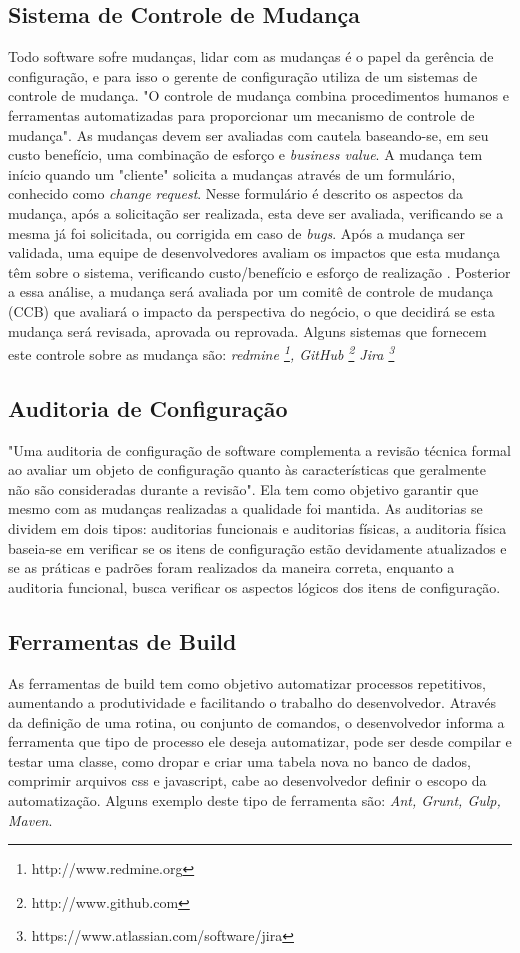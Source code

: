 \subsection{Sistema de Controle de Mudança}
Todo software sofre mudanças, lidar com as mudanças é o papel da gerência de configuração, e para isso o gerente de configuração utiliza de um sistemas de controle de mudança. "O controle de mudança combina procedimentos humanos e ferramentas automatizadas para proporcionar um mecanismo de controle de mudança"\space {}. As mudanças devem ser avaliadas com cautela baseando-se, em seu custo benefício, uma combinação de esforço e \textit{business value}. A mudança tem início quando um "cliente" solicita a mudanças através de um formulário, conhecido como \textit{change request}. Nesse formulário é descrito os aspectos da mudança, após a solicitação ser realizada, esta deve ser avaliada, verificando se a mesma já foi solicitada, ou corrigida em caso de \textit{bugs}. Após a mudança ser validada, uma equipe de desenvolvedores avaliam os impactos que esta mudança têm sobre o sistema, verificando custo/benefício e esforço de realização \cite{sommerville2011}. Posterior a essa análise, a mudança será avaliada por um comitê de controle de mudança (CCB) que avaliará o impacto da perspectiva do negócio, o que decidirá se esta mudança será revisada, aprovada ou reprovada. Alguns sistemas que fornecem este controle sobre as mudança são: \textit{redmine \footnote{http://www.redmine.org}, GitHub \footnote{http://www.github.com} Jira \footnote{https://www.atlassian.com/software/jira}}
\subsection{Auditoria de Configuração}
"Uma auditoria de configuração de software complementa a revisão técnica formal ao avaliar um objeto de configuração quanto às características que geralmente não são consideradas durante a revisão"\space{}. Ela tem como objetivo garantir que mesmo com as mudanças realizadas a qualidade foi mantida. As auditorias se dividem em dois tipos: auditorias funcionais e auditorias físicas, a auditoria física baseia-se em verificar se os itens de configuração estão devidamente atualizados e se as práticas e padrões foram realizados da maneira correta, enquanto a auditoria funcional, busca verificar os aspectos lógicos dos itens de configuração.
\subsection{Ferramentas de Build}
As ferramentas de build tem como objetivo automatizar processos repetitivos, aumentando a produtividade e facilitando o trabalho do desenvolvedor. Através da definição de uma rotina, ou conjunto de comandos, o desenvolvedor informa a ferramenta que tipo de processo ele deseja automatizar, pode ser desde compilar e testar uma classe, como dropar e criar uma tabela nova no banco de dados, comprimir arquivos css e javascript, cabe ao desenvolvedor definir o escopo da automatização. Alguns exemplo deste tipo de ferramenta são: \textit{Ant, Grunt, Gulp, Maven}.


